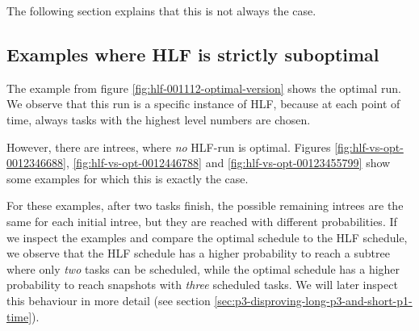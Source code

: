 The following section explains that this is not always the case.

\subsection{Examples where HLF is strictly suboptimal}
\label{sec:p3-suboptimal-hlf-strictly-suboptimal}

The example from figure \ref{fig:hlf-001112-optimal-version} shows the optimal run. We observe that this run is a specific instance of HLF, because at each point of time, always tasks with the highest level numbers are chosen.

However, there are intrees, where \emph{no} HLF-run is optimal. Figures \ref{fig:hlf-vs-opt-0012346688}, \ref{fig:hlf-vs-opt-0012446788} and \ref{fig:hlf-vs-opt-00123455799} show some examples for which this is exactly the case.

For these examples, after two tasks finish, the possible remaining intrees are the same for each initial intree, but they are reached with different probabilities. If we inspect the examples and compare the optimal schedule to the HLF schedule, we observe that the HLF schedule has a higher probability to reach a subtree where only \emph{two} tasks can be scheduled, while the optimal schedule has a higher probability to reach snapshots with \emph{three} scheduled tasks. We will later inspect this behaviour in more detail (see section \ref{sec:p3-disproving-long-p3-and-short-p1-time}).

